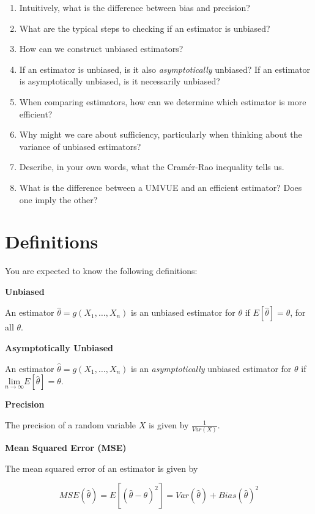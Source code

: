 \documentclass[
  letterpaper,
  DIV=11,
  numbers=noendperiod]{scrreprt}
\begin{document}
\begin{enumerate}
\def\labelenumi{\arabic{enumi}.}
\item
  Intuitively, what is the difference between bias and precision?
\item
  What are the typical steps to checking if an estimator is unbiased?
\item
  How can we construct unbiased estimators?
\item
  If an estimator is unbiased, is it also \emph{asymptotically}
  unbiased? If an estimator is asymptotically unbiased, is it
  necessarily unbiased?
\item
  When comparing estimators, how can we determine which estimator is
  more efficient?
\item
  Why might we care about sufficiency, particularly when thinking about
  the variance of unbiased estimators?
\item
  Describe, in your own words, what the Cramér-Rao inequality tells us.
\item
  What is the difference between a UMVUE and an efficient estimator?
  Does one imply the other?
\end{enumerate}

\section{Definitions}\label{definitions-3}

You are expected to know the following definitions:

\textbf{Unbiased}

An estimator \(\hat{\theta} = g(X_1, \dots, X_n)\) is an unbiased
estimator for \(\theta\) if \(E[\hat{\theta}] = \theta\), for all
\(\theta\).

\textbf{Asymptotically Unbiased}

An estimator \(\hat{\theta} = g(X_1, \dots, X_n)\) is an
\emph{asymptotically} unbiased estimator for \(\theta\) if
\(\underset{n \to \infty}{\text{lim}} E[\hat{\theta}] = \theta\).

\textbf{Precision}

The precision of a random variable \(X\) is given by
\(\frac{1}{Var(X)}\).

\textbf{Mean Squared Error (MSE)}

The mean squared error of an estimator is given by

\[
MSE(\hat{\theta}) = E[(\hat{\theta} - \theta)^2] = Var(\hat{\theta}) + Bias(\hat{\theta})^2
\]
\end{document}
